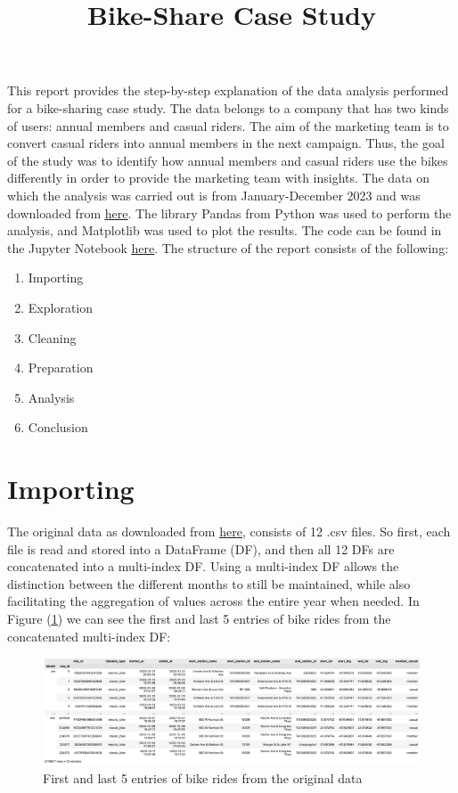 \documentclass[12pt]{article}
\begin{document}
\title{Bike-Share Case Study}
\date{}
\maketitle

This report provides the step-by-step explanation of the data analysis performed for a bike-sharing case study. The data belongs to a company that has two kinds of users: annual members and casual riders. The aim of the marketing team is to convert casual riders into annual members in the next campaign. Thus, the goal of the study was to identify how annual members and casual riders use the bikes differently in order to provide the marketing team with insights. The data on which the analysis was carried out is from January-December 2023 and was downloaded from \href{https://divvy-tripdata.s3.amazonaws.com/index.html}{\underline{here}}. The library Pandas from Python was used to perform the analysis, and Matplotlib was used to plot the results. The code can be found in the Jupyter Notebook \href{https://github.com/SummerKassem/BikeShareCS/blob/main/PythonCode/bike_share_analysis.ipynb}{\underline{here}}. The structure of the report consists of the following:
\begin{enumerate} 
	\item Importing
	\item Exploration
	\item Cleaning
	\item Preparation
	\item Analysis
	\item Conclusion
\end{enumerate}

\section{Importing}

The original data as downloaded from \href{https://divvy-tripdata.s3.amazonaws.com/index.html}{\underline{here}}, consists of 12 .csv files. So first, each file is read and stored into a DataFrame (DF), and then all 12 DFs are concatenated into a multi-index DF. Using a multi-index DF allows the distinction between the different months to still be maintained, while also facilitating the aggregation of values across the entire year when needed. In Figure (\underline{\ref{fig1}}) we can see the first and last 5 entries of bike rides from the concatenated multi-index DF:

	\begin{figure}[h]
	\centering
	\includegraphics[scale=0.4]{original_data.png}
	\caption{First and last 5 entries of bike rides from the original data}
	\label{fig1}
	\end{figure}
	\pagebreak
	
\end{document}
